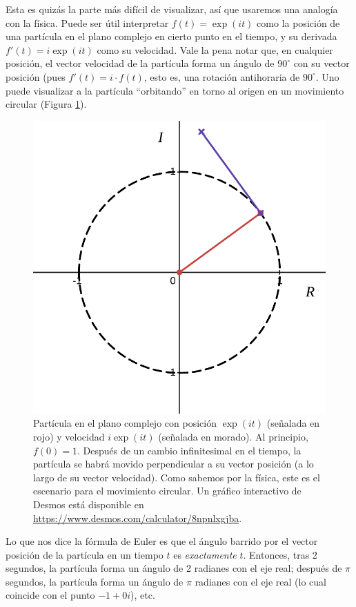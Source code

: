 Esta es quizás la parte más difícil de visualizar, así que usaremos una analogía con la física. Puede ser útil interpretar $f(t) = \exp(it)$ como la posición de una partícula en el plano complejo en cierto punto en el tiempo, y su derivada $f'(t) = i\exp(it)$ como su velocidad. Vale la pena notar que, en cualquier posición, el vector velocidad de la partícula forma un ángulo de $90^{\circ}$ con su vector posición (pues $f'(t) = i\cdot f(t)$, esto es, una rotación antihoraria de $90^{\circ}$. Uno puede visualizar a la partícula \enquote{orbitando} en torno al origen en un movimiento circular (Figura \ref{rot}).

\begin{figure}[H]
	\centering
	\includegraphics[width=\linewidth]{media/rotation.png}
	\caption{Partícula en el plano complejo con posición $\exp(it)$ (señalada en rojo) y velocidad $i\exp(it)$ (señalada en morado). Al principio, $f(0) = 1$. Después de un cambio infinitesimal en el tiempo, la partícula se habrá movido perpendicular a su vector posición (a lo largo de su vector velocidad). Como sabemos por la física, este es el escenario para el movimiento circular. Un gráfico interactivo de Desmos está disponible en \url{https://www.desmos.com/calculator/8npnlxgjba}.}
	\label{rot}
\end{figure}

Lo que nos dice la fórmula de Euler es que el ángulo barrido por el vector posición de la partícula en un tiempo $t$ es \textit{exactamente} $t$. Entonces, tras 2 segundos, la partícula forma un ángulo de 2 radianes con el eje real; después de $\pi$ segundos, la partícula forma un ángulo de $\pi$ radianes con el eje real (lo cual coincide con el punto $-1 + 0i$), etc.


